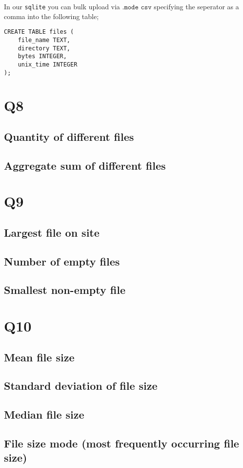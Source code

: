 \documentclass{article}
\begin{document}
In our \texttt{sqlite} you can bulk upload via $\texttt{.mode csv}$ specifying the seperator as a comma into the following table;

\begin{verbatim}
CREATE TABLE files (
    file_name TEXT,
    directory TEXT,
    bytes INTEGER,
    unix_time INTEGER
);
\end{verbatim}

\section*{Q8}
\subsection*{Quantity of different files}
\subsection*{Aggregate sum of different files}
\section*{Q9}
\subsection*{Largest file on site}
\subsection*{Number of empty files}
\subsection*{Smallest non-empty file}
\section*{Q10}
\subsection*{Mean file size}
\subsection*{Standard deviation of file size}
\subsection*{Median file size}
\subsection*{File size mode (most frequently occurring file size)}
\end{document}
